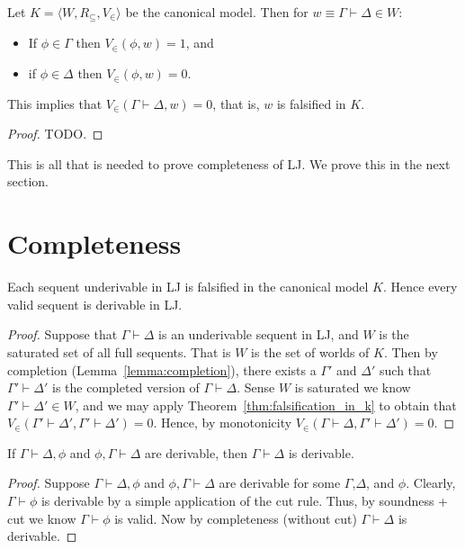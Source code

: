 \documentclass{article}
\begin{document}
\begin{thm}[Falsification in $K$]
  \label{thm:falsification_in_k}
  Let $K = \langle W, R_\subseteq, V_\in \rangle$ be the canonical model. Then for $w \equiv \Gamma \vdash \Delta \in W$:
  \begin{center}
    \begin{itemize}
    \item[] If $\phi \in \Gamma$ then $V_\in(\phi, w) = 1$, and
    \item[] if $\phi \in \Delta$ then $V_\in(\phi,w) = 0$.
    \end{itemize}
  \end{center}
  This implies that $V_\in(\Gamma \vdash \Delta, w) = 0$, that is, $w$ is falsified in $K$.
\end{thm}
\begin{proof}
  TODO.
\end{proof}

\noindent
This is all that is needed to prove completeness of LJ.  We prove this in the next section.

\section{Completeness}
\label{sec:completeness}

\begin{thm}[Completeness]
  \label{thm:completeness}
  Each sequent underivable in LJ is falsified in the canonical model $K$.  Hence
  every valid sequent is derivable in LJ.
\end{thm}
\begin{proof}
  Suppose that $\Gamma \vdash \Delta$ is an underivable sequent in LJ, and $W$ is the saturated set of all full sequents.
  That is $W$ is the set of worlds of $K$. Then by completion (Lemma~\ref{lemma:completion}),
  there exists a $\Gamma'$ and $\Delta'$ such that $\Gamma' \vdash \Delta'$ is the completed version of $\Gamma \vdash \Delta$. 
  Sense $W$ is saturated we know $\Gamma' \vdash \Delta' \in W$, and we may apply Theorem~\ref{thm:falsification_in_k} to obtain
  that $V_\in(\Gamma' \vdash \Delta', \Gamma' \vdash \Delta') = 0$.  Hence, by monotonicity 
  $V_\in(\Gamma \vdash \Delta, \Gamma' \vdash \Delta') = 0$.
\end{proof}

\begin{corollary}
  \label{corollary:admissibility_of_cut}
  If $\Gamma \vdash \Delta, \phi$ and $\phi, \Gamma \vdash \Delta$ are derivable, then $\Gamma \vdash \Delta$ is derivable.
\end{corollary}
\begin{proof}
  Suppose $\Gamma \vdash \Delta, \phi$ and $\phi, \Gamma \vdash \Delta$ are derivable for some $\Gamma$,$\Delta$, and $\phi$.
  Clearly, $\Gamma \vdash \phi$ is derivable by a simple application of the cut rule.  Thus, by soundness + cut we know 
  $\Gamma \vdash \phi$ is valid.  Now by completeness (without cut) $\Gamma \vdash \Delta$ is derivable. 
\end{proof}
\end{document}
